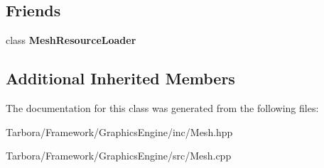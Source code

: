 \subsection*{Friends}
\begin{DoxyCompactItemize}
\item 
\mbox{\label{classTarbora_1_1Mesh_a27c9226be711b1d4d1e81ab76c541bf2}} 
class {\bfseries Mesh\+Resource\+Loader}
\end{DoxyCompactItemize}
\subsection*{Additional Inherited Members}


The documentation for this class was generated from the following files\+:\begin{DoxyCompactItemize}
\item 
Tarbora/\+Framework/\+Graphics\+Engine/inc/Mesh.\+hpp\item 
Tarbora/\+Framework/\+Graphics\+Engine/src/Mesh.\+cpp\end{DoxyCompactItemize}
